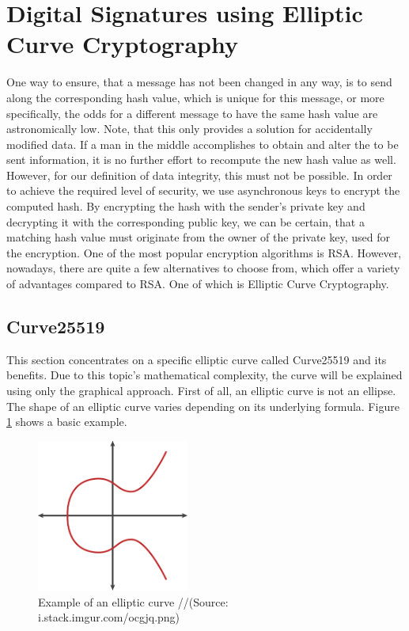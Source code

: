 \section{Digital Signatures using Elliptic Curve Cryptography}

One way to ensure, that a message has not been changed in any way, is to send along the corresponding hash value, which is unique for this message, or more specifically, the odds for a different message to have the same hash value are astronomically low. Note, that this only provides a solution for accidentally modified data. If a man in the middle accomplishes to obtain and alter the to be sent information, it is no further effort to recompute the new hash value as well. However, for our definition of data integrity, this must not be possible. In order to achieve the required level of security, we use asynchronous keys to encrypt the computed hash. By encrypting the hash with the sender's private key and decrypting it with the corresponding public key, we can be certain, that a matching hash value must originate from the owner of the private key, used for the encryption. 
One of the most popular encryption algorithms is RSA. However, nowadays, there are quite a few alternatives to choose from, which offer a variety of advantages compared to RSA. One of which is Elliptic Curve Cryptography. 

\subsection{Curve25519}
This section concentrates on a specific elliptic curve called Curve25519 and its benefits.
Due to this topic's mathematical complexity, the curve will be explained using only the graphical approach.
First of all, an elliptic curve is not an ellipse. The shape of an elliptic curve varies depending on its underlying formula. Figure \ref{ec1} shows a basic example.
\begin{figure}
\centering
\includegraphics[width=5cm]{Pages/EC/ec.png}
\caption{Example of an elliptic curve //(Source: i.stack.imgur.com/ocgjq.png)}
\label{ec1}
\end{figure}

